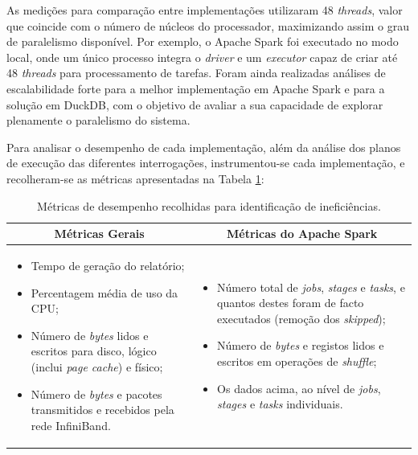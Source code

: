 \documentclass[11pt, a4paper]{article}
\begin{document}
As medições para comparação entre implementações utilizaram 48 \emph{threads}, valor que coincide
com o número de núcleos do processador, maximizando assim o grau de paralelismo disponível. Por
exemplo, o Apache Spark foi executado no modo local, onde um único processo integra o \emph{driver}
e um \emph{executor} capaz de criar até 48 \emph{threads} para processamento de tarefas. Foram ainda
realizadas análises de escalabilidade forte para a melhor implementação em Apache Spark e para a
solução em DuckDB, com o objetivo de avaliar a sua capacidade de explorar plenamente o paralelismo
do sistema.

Para analisar o desempenho de cada implementação, além da análise dos planos de execução das
diferentes interrogações, instrumentou-se cada implementação, e recolheram-se as
métricas apresentadas na Tabela \ref{instrumentation-metrics}:

\begin{table}[H]
    \centering
    \setlength{\leftmargini}{3ex}
    \begin{tabular}{@{}|m{}|m{}|}
        \hline
        \multicolumn{1}{|c|}{\textbf{Métricas Gerais}} &
        \multicolumn{1}{c|}{\textbf{Métricas do Apache Spark}} \\
        \hline

        \begin{itemize}
            \item Tempo de geração do relatório;
            \item Percentagem média de uso da CPU;
            \item Número de \emph{bytes} lidos e escritos para disco, lógico (inclui \emph{page
                  cache}) e físico;
            \item Número de \emph{bytes} e pacotes transmitidos e recebidos pela rede InfiniBand.
        \end{itemize} &
        \begin{itemize}
            \item Número total de \emph{jobs}, \emph{stages} e \emph{tasks}, e quantos destes foram
                  de facto executados (remoção dos \emph{skipped});
            \item Número de \emph{bytes} e registos lidos e escritos em operações de \emph{shuffle};
            \item Os dados acima, ao nível de \emph{jobs}, \emph{stages} e \emph{tasks} individuais.
        \end{itemize} \\
        \hline
    \end{tabular}

    \caption{Métricas de desempenho recolhidas para identificação de ineficiências.}
    \label{instrumentation-metrics}
\end{table}
\end{document}
